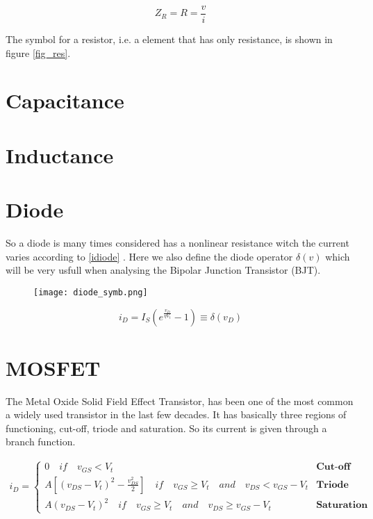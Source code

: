 \documentclass[a4paper]{report}
\begin{document}
\begin{equation} \label{zresistance}
Z_R=R=\frac{v}{i}
\end{equation}

The symbol for a resistor, i.e. a element that has only resistance, is shown in figure \ref{fig_res}.


\begin{figure}

\end{figure}


\section{Capacitance}

\section{Inductance}


\section{Diode}
So a diode is many times considered has a nonlinear resistance  witch the current varies according to \ref{idiode} . Here we also define the diode operator $\delta(v)$ which will be very usfull when analysing the Bipolar Junction Transistor (BJT).

\begin{figure}[H]
\begin{center}
\texttt{[image: diode\_symb.png]}
\end{center}
\end{figure}

\begin{equation} \label{idiode}
i_D=I_{S}(e^{\frac{v_D}{\eta V_t}}-1)\equiv \delta(v_D)
\end{equation}

\newpage
\section{MOSFET}
The Metal Oxide Solid Field Effect Transistor, has been one of the most common a widely used transistor in the last few decades. It has basically three regions of functioning, cut-off, triode and saturation. So its current is given through a branch function.

\begin{eqnarray}
i_D=\begin{cases}0 \quad if \quad v_{GS}<V_t &\textbf{Cut-off}\\ 
A[(v_{DS}-V_t)^2-\frac{v_{DS}^2}{2}] \quad if \quad v_{GS}\ge V_t \quad and \quad v_{DS}< v_{GS}-V_t &\textbf{Triode} \\ 
A(v_{DS}-V_t)^2 \quad if \quad v_{GS}\ge V_t \quad and \quad v_{DS}\ge v_{GS}-V_t &\textbf{Saturation}\end{cases} 
\end{eqnarray}
\end{document}
